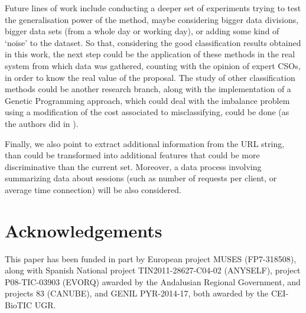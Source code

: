 \documentclass{llncs}
\begin{document}
% 
Future lines of work include conducting a deeper set of experiments trying to test the generalisation power of the method, maybe considering bigger data divisions, bigger data sets (from a whole day or working day), or adding some kind of `noise' to the dataset.
So that, considering the good classification results obtained in this work, the next step could be the application of these methods in the real system from which data was gathered, counting with the opinion of expert CSOs, in order to know the real value of the proposal.
The study of other classification methods could be another research branch, along with the implementation of a Genetic Programming approach, which could deal with the imbalance problem using a modification of the cost associated to misclassifying, could be done (as the authors did in \cite{cost_adjustment_07}).

Finally, we also point to extract additional information from the URL string, than could be transformed into additional features that could be more discriminative than the current set. Moreover, a data process involving summarizing data about sessions (such as number of requests per client, or average time connection) will be also considered.



\section*{Acknowledgements}
This paper has been funded in part by European project MUSES (FP7-318508), along with Spanish National project TIN2011-28627-C04-02 (ANYSELF), project P08-TIC-03903 (EVORQ) awarded by the Andalusian Regional Government, and projects 83 (CANUBE), and GENIL PYR-2014-17, both awarded by the CEI-BioTIC UGR.



\end{document}
